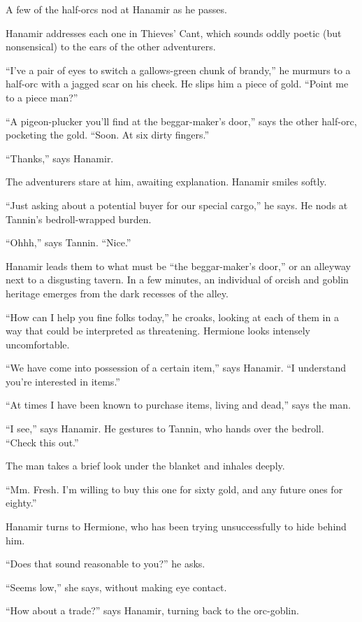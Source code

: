 \documentclass[smalldemyvopaper,11pt,twoside,onecolumn,openright,extrafontsizes]{memoir}
\begin{document}
A few of the half-orcs nod at Hanamir as he passes.

Hanamir addresses each one in Thieves' Cant, which sounds oddly poetic
(but nonsensical) to the ears of the other adventurers.

``I've a pair of eyes to switch a gallows-green chunk of brandy,'' he
murmurs to a half-orc with a jagged scar on his cheek. He slips him a
piece of gold. ``Point me to a piece man?''

``A pigeon-plucker you'll find at the beggar-maker's door,'' says the
other half-orc, pocketing the gold. ``Soon. At six dirty fingers.''

``Thanks,'' says Hanamir.

The adventurers stare at him, awaiting explanation. Hanamir smiles
softly.

``Just asking about a potential buyer for our special cargo,'' he says.
He nods at Tannin's bedroll-wrapped burden.

``Ohhh,'' says Tannin. ``Nice.''

Hanamir leads them to what must be ``the beggar-maker's door,'' or an
alleyway next to a disgusting tavern. In a few minutes, an individual of
orcish and goblin heritage emerges from the dark recesses of the alley.

``How can I help you fine folks today,'' he croaks, looking at each of
them in a way that could be interpreted as threatening. Hermione looks
intensely uncomfortable.

``We have come into possession of a certain item,'' says Hanamir. ``I
understand you're interested in items.''

``At times I have been known to purchase items, living and dead,'' says
the man.

``I see,'' says Hanamir. He gestures to Tannin, who hands over the
bedroll. ``Check this out.''

The man takes a brief look under the blanket and inhales deeply.

``Mm. Fresh. I'm willing to buy this one for sixty gold, and any future
ones for eighty.''

Hanamir turns to Hermione, who has been trying unsuccessfully to hide
behind him.

``Does that sound reasonable to you?'' he asks.

``Seems low,'' she says, without making eye contact.

``How about a trade?'' says Hanamir, turning back to the orc-goblin.
\end{document}
